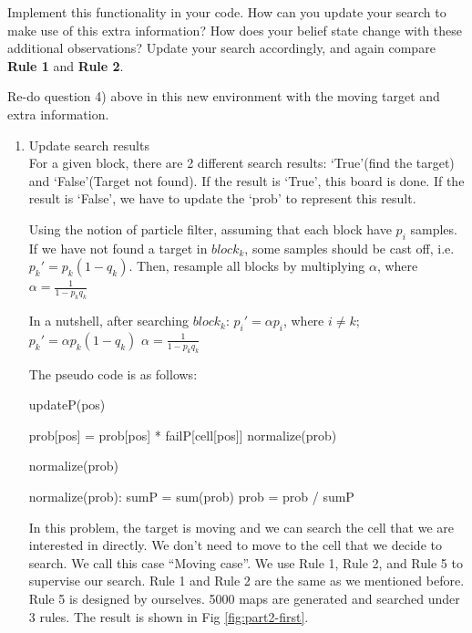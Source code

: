 \documentclass[letter]{article}
\begin{document}
\par{Implement this functionality in your code. How can you update your search to make use of this extra information?
	How does your belief state change with these additional observations? Update your search accordingly, and again
	compare \textbf{Rule 1} and \textbf{Rule 2}.}

\par{Re-do question 4) above in this new environment with the moving target and extra information.}
\begin{enumerate}
	\item {Update search results} \\
	For a given block, there are 2 different search results: `True'(find the target) and `False'(Target not found). If the result is `True', this board is done. If the result is `False', we have to update the `prob' to represent this result.
		
	Using the notion of particle filter, assuming that each block have $p_i$ samples. If we have not found a target in $block_k$, some samples should be cast off, i.e. $p_k' = p_k(1-q_k)$. Then, resample all blocks by multiplying $\alpha$, where $\alpha = \frac{1}{1-p_kq_k}$
		
	In a nutshell, after searching $block_k$: 
	$p_i' = \alpha p_i$, where $i\ne k$; 
	$p_k' = \alpha p_k(1-q_k)$
	$\alpha = \frac{1}{1-p_kq_k}$
	
	The pseudo code is as follows:
	\begin{algorithm}[H]
		\caption{updateP(pos)}
		\begin{algorithmic}
			\STATE prob[pos] = prob[pos] * failP[cell[pos]]
			\STATE normalize(prob)
			\RETURN 
		\end{algorithmic}
	\end{algorithm}
	\begin{algorithm}[H]
	\caption{normalize(prob)}
	\begin{algorithmic}
		\STATE normalize(prob):
		\STATE sumP = sum(prob)
		\STATE prob = prob / sumP
		\RETURN 
	\end{algorithmic}
	\end{algorithm}

	In this problem, the target is moving and we can search the cell that we are interested in
	directly. We don’t need to move to the cell that we decide to search. We call this case
	“Moving case”. We use Rule 1, Rule 2, and Rule 5 to supervise our search. Rule 1 and
	Rule 2 are the same as we mentioned before. Rule 5 is designed by ourselves. 5000
	maps are generated and searched under 3 rules. The result is shown in Fig \ref{fig:part2-first}.
	

\end{enumerate}
\end{document}

